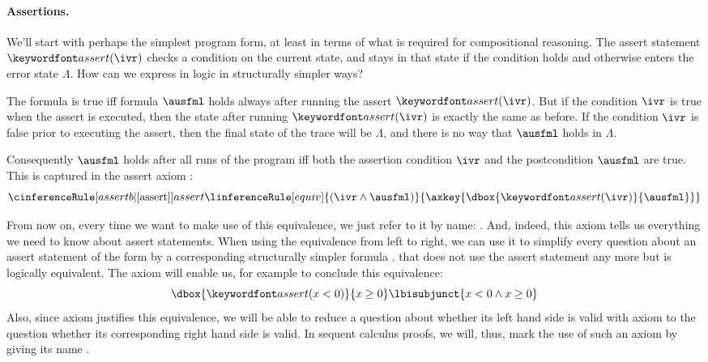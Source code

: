 \documentclass[11pt,twoside]{scrartcl}
\newcommand{\errstate}{\ensuremath{\Lambda}\xspace}
\begin{document}
\paragraph{Assertions.}

We'll start with perhaps the simplest program form, at least in terms of what is required for compositional reasoning.
The assert statement $\passert{\ivr}$ checks a condition on the current state, and stays in that state if the condition holds and otherwise enters the error state \errstate.
How can we express \m{\dbox{\passert{\ivr}}{\ausfml}} in logic in structurally simpler ways?

The formula \m{\dbox{\passert{\ivr}}{\ausfml}} is true iff formula $\ausfml$ holds always after running the assert $\passert{\ivr}$. But if the condition $\ivr$ is true when the assert is executed, then the state after running $\passert{\ivr}$ is exactly the same as before. If the condition $\ivr$ is false prior to executing the assert, then the final state of the trace will be $\errstate$, and there is no way that $\ausfml$ holds in $\errstate$.

Consequently $\ausfml$ holds after all runs of the program \m{\passert{\ivr}} iff both the assertion condition $\ivr$ and the postcondition $\ausfml$ are true.
This is captured in the assert axiom :
\[
\cinferenceRule[assertb|$\dibox{\text{assert}}$]{assert}
{\linferenceRule[equiv]
  {(\ivr \land \ausfml)}
  {\axkey{\dbox{\passert{\ivr}}{\ausfml}}}
}{}%
\]

From now on, every time we want to make use of this equivalence, we just refer to it by name: .
And, indeed, this axiom tells us everything we need to know about assert statements.
When using the equivalence  from left to right, we can use it to simplify every question about an assert statement of the form \m{\dbox{\passert{\busfml}}{\ausfml}}  by a corresponding structurally simpler formula .
that does not use the assert statement any more but is logically equivalent.
The axiom will enable us, for example to conclude this equivalence:
\[
{\dbox{\passert{x < 0}}{x \ge 0}}
\lbisubjunct
{x < 0 \land x \ge 0}
\]
Also, since axiom  justifies this equivalence, we will be able to reduce a question about whether its left hand side is valid with axiom  to the question whether its corresponding right hand side is valid.
In sequent calculus proofs, we will, thus, mark the use of such an axiom by giving its name .
\end{document}
